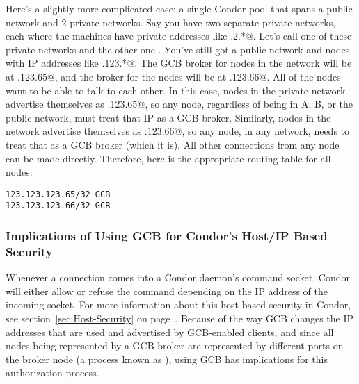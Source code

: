 
Here's a slightly more complicated case: a single Condor pool that
spans a public network and 2 private networks.
Say you have two separate private networks, each where the machines
have private addresses like .2.*@.
Let's call one of these private networks \verb@A@ and the other one
\verb@B@. 
You've still got a public network and nodes with IP addresses like
.123.*@.
The GCB broker for nodes in the \verb@A@ network will be at
.123.65@, and the broker for the \verb@B@ nodes will be
at .123.66@.
All of the nodes want to be able to talk to each other.
In this case, nodes in the \verb@A@ private network advertise
themselves as .123.65@, so any node, regardless of being
in A, B, or the public network, must treat that IP as a GCB broker.
Similarly, nodes in the \verb@B@ network advertise themselves as
.123.66@, so any node, in any network, needs to treat
that as a GCB broker (which it is).
All other connections from any node can be made directly.
Therefore, here is the appropriate routing table for all nodes:

\begin{verbatim}
123.123.123.65/32 GCB
123.123.123.66/32 GCB
\end{verbatim}


\subsubsection{\label{sec:GCB-host-security-implications}Implications
of Using GCB for Condor's Host/IP Based Security} 

Whenever a connection comes into a Condor daemon's command socket,
Condor will either allow or refuse the command depending on the IP
address of the incoming socket.
For more information about this host-based security in Condor, see
section~\ref{sec:Host-Security} on page~\pageref{sec:Host-Security}.
Because of the way GCB changes the IP addresses that are used and
advertised by GCB-enabled clients, and since all nodes being
represented by a GCB broker are represented by different ports on the
broker node (a process known as ), using GCB has
implications for this authorization process.

